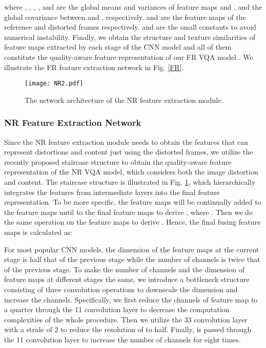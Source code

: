 \documentclass{article}
\begin{document}
where , , , , and  are the global means and variances of feature maps  and , and the global covariance between   and , respectively.  and  are the feature maps of the reference and distorted frames respectively.  and  are the small constants to avoid numerical instability. Finally, we obtain the structure and texture similarities of feature maps extracted by each stage of the CNN model and all of them constitute the quality-aware feature representation of our FR VQA model . We illustrate the FR feature extraction network in Fig. \ref{FR}.

\begin{figure}[!t]
	\centering
	\texttt{[image: NR2.pdf]}
	\caption{The network architecture of the NR feature extraction module.}
	\label{NR}
	\vspace{-0.3cm}
\end{figure}

\subsubsection{NR Feature Extraction Network}
Since the NR feature extraction module needs to obtain the features that can represent distortions and content just using the distorted frames, we utilize the recently proposed staircase structure \cite{sun2021blind} to obtain the quality-aware feature representation of the NR VQA model, which considers both the image distortion and content. The staircase structure is illustrated in Fig. \ref{NR}, which hierarchically integrates the features from intermediate layers into the final feature representation. To be more specific, the feature maps  will be continually added to the feature maps  until to the final feature maps  to derive , where . Then we do the same operation on the feature maps  to derive . Hence, the final fusing feature maps  is calculated as:



For most popular CNN models, the dimension of the feature maps at the current stage is half that of the previous stage while the number of channels is twice that of the previous stage. To make the number of channels and the dimension of feature maps at different stages the same, we introduce a bottleneck structure consisting of three convolution operations to downscale the dimension and increase the channels. Specifically, we first reduce the channels of feature map  to a quarter through the 11 convolution layer to decrease the computation complexities of the whole procedure. Then we utilize the 33 convolution layer with a stride of 2 to reduce the resolution of  to half. Finally,  is passed through the 11 convolution layer to increase the number of channels for eight times.
\end{document}
